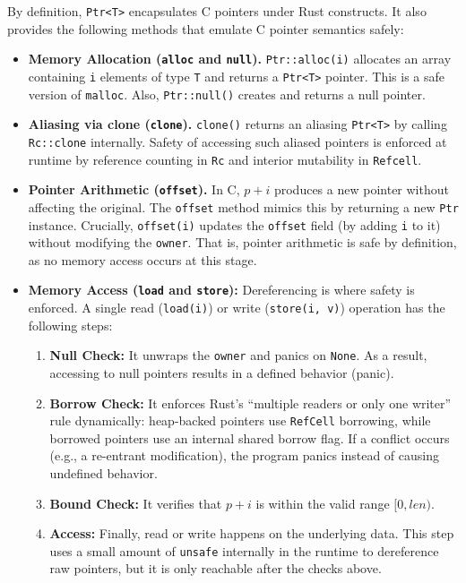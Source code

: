 \documentclass{llncs} %
\begin{document}
By definition, \texttt{Ptr<T>} encapsulates C pointers under Rust constructs. It also provides the following methods that emulate C pointer semantics safely:

\begin{itemize}
    \item \textbf{Memory Allocation (\texttt{alloc} and \texttt{null}).}
    \texttt{Ptr::alloc(i)} allocates an array containing \texttt{i} elements of type \texttt{T} and returns a \texttt{Ptr<T>} pointer. This is a safe version of \texttt{malloc}. Also, \texttt{Ptr::null()} creates and returns a null pointer.

    \item \textbf{Aliasing via clone (\texttt{clone}).} \texttt{clone()} returns an aliasing \texttt{Ptr<T>} by calling \texttt{Rc::clone} internally. Safety of accessing such aliased pointers is enforced at runtime by reference counting in \texttt{Rc} and interior mutability in \texttt{Refcell}.
    \item \textbf{Pointer Arithmetic (\texttt{offset}).} 
    In C, $p + i$ produces a new pointer without affecting the original. The \texttt{offset} method mimics this by returning a new \texttt{Ptr} instance. Crucially, \texttt{offset(i)} updates the \texttt{offset} field (by adding \texttt{i} to it) without modifying the \texttt{owner}. That is, pointer arithmetic is safe by definition, as no memory access occurs at this stage.
    
    \item \textbf{Memory Access (\texttt{load} and \texttt{store}):} 
    Dereferencing is where safety is enforced. A single read (\texttt{load(i)}) or write (\texttt{store(i, v)}) operation has the following steps:
    \begin{enumerate}
        \item \textbf{Null Check:} It unwraps the \texttt{owner} and panics on \texttt{None}. As a result, accessing to null pointers results in a defined behavior (panic). 
        \item \textbf{Borrow Check:} It enforces Rust's ``multiple readers or only one writer'' rule dynamically: heap-backed pointers use \texttt{RefCell} borrowing, while borrowed pointers use an internal shared borrow flag. If a conflict occurs (e.g., a re-entrant modification), the program panics instead of causing undefined behavior.
        \item \textbf{Bound Check:} It verifies that $p + i$ is within the valid range $[0, len)$.
        \item \textbf{Access:} Finally, read or write happens on the underlying data. This step uses a small amount of \texttt{unsafe} internally in the runtime to dereference raw pointers, but it is only reachable after the checks above.
    \end{enumerate}
\end{itemize}
\end{document}
